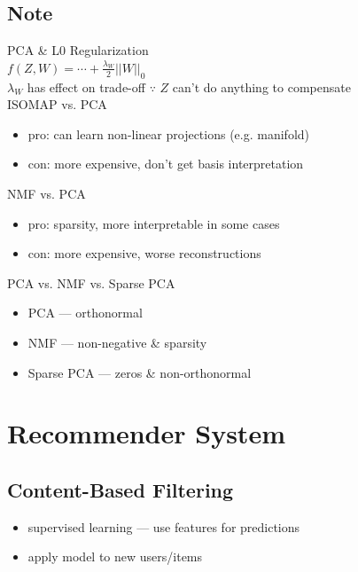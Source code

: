 \documentclass[10pt,landscape,a4paper]{article}
\begin{document}
\begin{multicols*}{5}
\subsection{Note}
PCA \& L0 Regularization \\
\(f(Z,W) = \cdots + \frac{\lambda_W}{2} ||W||_0\) \\
\(\lambda_W\) has effect on trade-off \(\because \) \(Z\) can't do anything to compensate \\
ISOMAP vs. PCA
\begin{itemize}
    \item pro: can learn non-linear projections (e.g. manifold)
    \item con: more expensive, don't get basis interpretation
\end{itemize}
NMF vs. PCA
\begin{itemize}
    \item pro: sparsity, more interpretable in some cases
    \item con: more expensive, worse reconstructions
\end{itemize}
PCA vs. NMF vs. Sparse PCA
\begin{itemize}
    \item PCA --- orthonormal
    \item NMF --- non-negative \& sparsity
    \item Sparse PCA --- zeros \& non-orthonormal
\end{itemize}

\section{Recommender System}

\subsection{Content-Based Filtering}
\begin{itemize}
    \item supervised learning --- use features for predictions
    \item apply model to new users/items
\end{itemize}


\end{multicols*}
\end{document}
